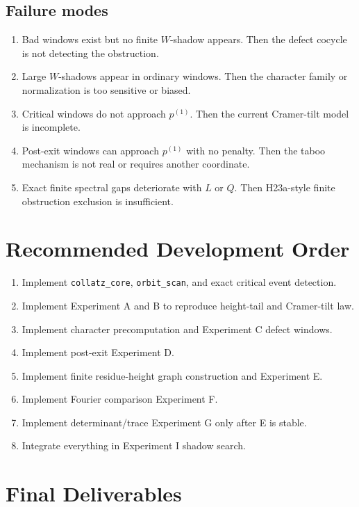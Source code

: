 \documentclass[11pt]{article}
\begin{document}
\subsection{Failure modes}

\begin{enumerate}
\item Bad windows exist but no finite \(W\)-shadow appears.  Then the defect cocycle is not detecting the obstruction.
\item Large \(W\)-shadows appear in ordinary windows.  Then the character family or normalization is too sensitive or biased.
\item Critical windows do not approach \(p^{(1)}\).  Then the current Cramer-tilt model is incomplete.
\item Post-exit windows can approach \(p^{(1)}\) with no penalty.  Then the taboo mechanism is not real or requires another coordinate.
\item Exact finite spectral gaps deteriorate with \(L\) or \(Q\).  Then H23a-style finite obstruction exclusion is insufficient.
\end{enumerate}

\section{Recommended Development Order}

\begin{enumerate}
\item Implement \texttt{collatz\_core}, \texttt{orbit\_scan}, and exact critical event detection.
\item Implement Experiment A and B to reproduce height-tail and Cramer-tilt law.
\item Implement character precomputation and Experiment C defect windows.
\item Implement post-exit Experiment D.
\item Implement finite residue-height graph construction and Experiment E.
\item Implement Fourier comparison Experiment F.
\item Implement determinant/trace Experiment G only after E is stable.
\item Integrate everything in Experiment I shadow search.
\end{enumerate}

\section{Final Deliverables}
\end{document}
